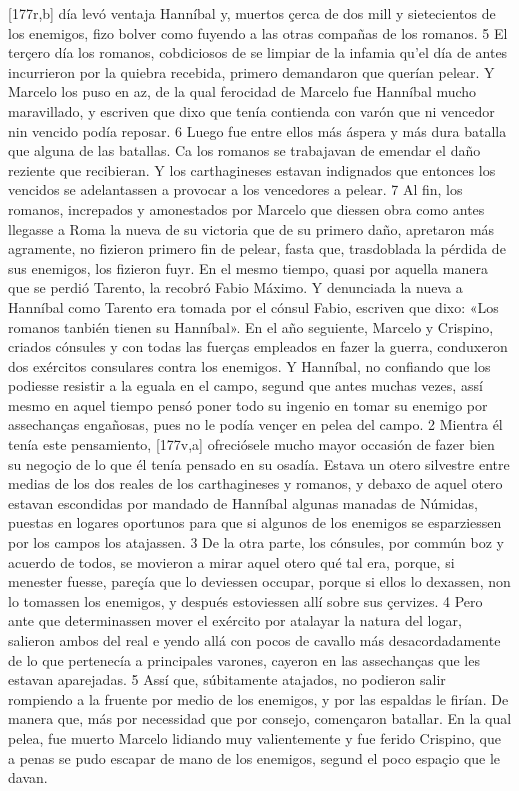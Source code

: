 \documentclass[11pt,twoside]{article}\makeatletter
\def\persName{}\def\name{}
\def\placeName{}
\begin{document}
[177r,b] día levó ventaja  {\persName Hanníbal} y, muertos çerca de dos mill y sietecientos de los enemigos, fizo bolver como fuyendo a las otras compañas de los romanos. 5 El terçero día los romanos, cobdiciosos de se limpiar de la infamia qu’el día de antes incurrieron por la quiebra recebida, primero demandaron que querían pelear. Y Marcelo los puso en az, de la qual ferocidad de Marcelo fue  {\persName Hanníbal} mucho maravillado, y escriven que dixo que tenía contienda con varón que ni vencedor nin vencido podía reposar. 6 Luego fue entre ellos más áspera y más dura batalla que alguna de las batallas. Ca los romanos se trabajavan de emendar el daño reziente que recibieran. Y los  {\name carthagineses} estavan indignados que entonces los vencidos se adelantassen a provocar a los vencedores a pelear. 7 Al fin, los romanos, increpados y amonestados por Marcelo que diessen obra como antes llegasse a  {\placeName Roma} la nueva de su victoria que de su primero daño, apretaron más agramente, no fizieron primero fin de pelear, fasta que, trasdoblada la pérdida de sus enemigos, los fizieron fuyr.
\pend
{} En el mesmo tiempo, quasi por aquella manera que se perdió Tarento, la recobró Fabio Máximo. Y denunciada la nueva a  {\persName Hanníbal} como Tarento era tomada por el cónsul Fabio, escriven que dixo: «Los romanos tanbién tienen su  {\persName Hanníbal}».
\pend
{} En el año seguiente, Marcelo y Crispino, criados cónsules y con todas las fuerças empleados en fazer la guerra, conduxeron dos exércitos consulares contra los enemigos. Y  {\persName Hanníbal}, no confiando que los podiesse resistir a la eguala en el campo, segund que antes muchas vezes, assí mesmo en aquel tiempo pensó poner todo su ingenio en tomar su enemigo por assechanças engañosas, pues no le podía vençer en pelea del campo. 2 Mientra él tenía este pensamiento, %
[177v,a] ofreciósele mucho mayor occasión de fazer bien su negoçio de lo que él tenía pensado en su osadía. Estava un otero silvestre entre medias de los dos reales de los  {\name carthagineses} y romanos, y debaxo de aquel otero estavan escondidas por mandado de  {\persName Hanníbal} algunas manadas de Númidas, puestas en logares oportunos para que si algunos de los enemigos se esparziessen por los campos los atajassen. 3 De la otra parte, los cónsules, por commún boz y acuerdo de todos, se movieron a mirar aquel otero qué tal era, porque, si menester fuesse, pareçía que lo deviessen occupar, porque si ellos lo dexassen, non lo tomassen los enemigos, y después estoviessen allí sobre sus çervizes. 4 Pero ante que determinassen mover el exército por atalayar la natura del logar, salieron ambos del real e yendo allá con pocos de cavallo más desacordadamente de lo que pertenecía a  principales varones, cayeron en las assechanças que les estavan aparejadas. 5 Assí que, súbitamente atajados, no podieron salir rompiendo a la fruente por medio de los enemigos, y por las espaldas le firían. De manera que, más por necessidad que por consejo, començaron batallar. En la qual pelea, fue muerto Marcelo lidiando muy valientemente y fue ferido Crispino, que a penas se pudo escapar de mano de los enemigos, segund el poco espaçio que le davan.
\end{document}
